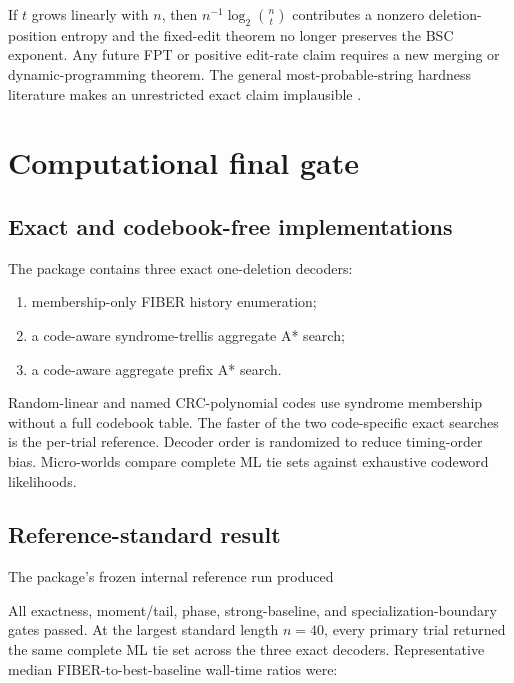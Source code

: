 \documentclass[11pt]{article}
\theoremstyle{definition}
\theoremstyle{remark}
\begin{document}
If $t$ grows linearly with $n$, then $n^{-1}\log_2\binom nt$ contributes a nonzero deletion-position entropy and the fixed-edit theorem no longer preserves the BSC exponent.  Any future FPT or positive edit-rate claim requires a new merging or dynamic-programming theorem.  The general most-probable-string hardness literature makes an unrestricted exact claim implausible \cite{HigueraOncina2014,Fijalkow2022}.

\section{Computational final gate}
\subsection{Exact and codebook-free implementations}
The package contains three exact one-deletion decoders:
\begin{enumerate}[leftmargin=2em]
\item membership-only FIBER history enumeration;
\item a code-aware syndrome-trellis aggregate A* search;
\item a code-aware aggregate prefix A* search.
\end{enumerate}
Random-linear and named CRC-polynomial codes use syndrome membership without a full codebook table.  The faster of the two code-specific exact searches is the per-trial reference.  Decoder order is randomized to reduce timing-order bias.  Micro-worlds compare complete ML tie sets against exhaustive codeword likelihoods.

\subsection{Reference-standard result}
The package's frozen internal reference run produced
\begin{center}
\small{}
\end{center}
All exactness, moment/tail, phase, strong-baseline, and specialization-boundary gates passed.  At the largest standard length $n=40$, every primary trial returned the same complete ML tie set across the three exact decoders.  Representative median FIBER-to-best-baseline wall-time ratios were:
\end{document}
